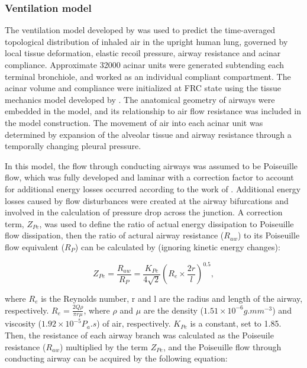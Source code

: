 \subsubsection{Ventilation model}
The ventilation model developed by \cite{swan2012computational} was used to predict the time-averaged topological distribution of inhaled air in the upright human lung, governed by local tissue deformation, elastic recoil pressure, airway resistance and acinar compliance. Approximate 32000 acinar units were generated subtending each terminal bronchiole, and worked as an individual compliant compartment. The acinar volume and compliance were initialized at FRC state using the tissue mechanics model developed by \cite{tawhai2009supine}. The anatomical geometry of airways were embedded in the model, and its relationship to air flow resistance was included in the model construction. The movement of air into each acinar unit was determined by expansion of the alveolar tissue and airway resistance through a temporally changing pleural pressure.

In this model, the flow through conducting airways was assumed to be Poiseuille flow, which was fully developed and laminar with a correction factor to account for additional energy losses occurred according to the work of \cite{pedley1970energy}. Additional energy losses caused by flow disturbances were created at the airway bifurcations and involved in the calculation of pressure drop across the junction. A correction term, $Z_{Pe}$, was used to define the ratio of actual energy dissipation to Poiseuille flow dissipation, then the ratio of actural airway resistance ($R_{aw}$) to its Poiseuille flow equivalent ($R_P$) can be calculated by (ignoring kinetic energy changes):

\begin{equation}
 \label{eq:EnergyDissipation}
 Z_{Pe} = \frac{R_{aw}}{R_P} = \frac{K_{Pe}}{4\sqrt{2}}(R_e \times \frac{2r}{l})^{0.5},
\end{equation}

\noindent where $R_e$ is the Reynolds number, r and l are the radius and length of the airway, respectively. $R_e = \frac{2Q\rho}{\pi r \mu}$, where $\rho$ and $\mu$ are the density ($1.51 \times 10^{-6}g.mm^{-3}$) and viscosity ($1.92 \times 10^{-5}P_{a}.s$) of air, respectively. $K_{Pe}$ is a constant, set to 1.85. Then, the resistance of each airway branch was calculated as the Poiseuile resistance ($R_{aw}$) multiplied by the term $Z_{Pe}$, and the Poiseuille flow through conducting airway can be acquired by the following equation:

